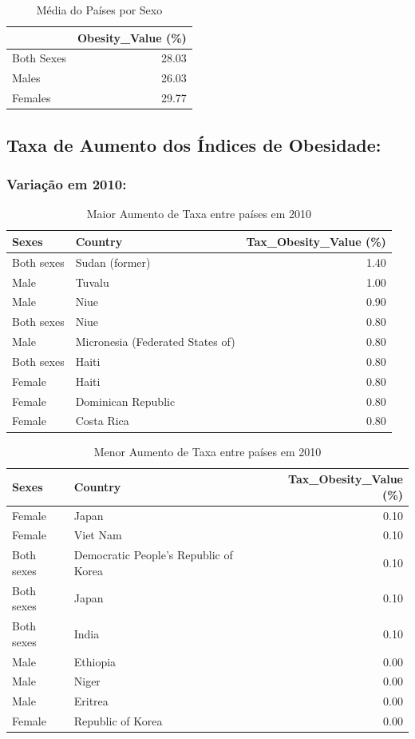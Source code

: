 \documentclass{article}%
\begin{document}
\begin{table}[htbp]%
\centering%
\begin{tabular}{lr}
\toprule
 & Obesity\_Value (\%) \\
\midrule
Both Sexes & 28.03 \\
Males & 26.03 \\
Females & 29.77 \\
\bottomrule
\end{tabular}
%
\caption{Média do Países por Sexo}%
\end{table}

%
\newpage%
\subsection{Taxa de Aumento dos Índices de Obesidade:}%
\label{subsec:TaxadeAumentodosndicesdeObesidade}%
\subsubsection{Variação em 2010:}%
\label{ssubsec:Variaoem2010}%


\begin{table}[htbp]%
\centering%
\begin{tabular}{llr}
\toprule
Sexes & Country & Tax\_Obesity\_Value (\%) \\
\midrule
Both sexes & Sudan (former) & 1.40 \\
Male & Tuvalu & 1.00 \\
Male & Niue & 0.90 \\
Both sexes & Niue & 0.80 \\
Male & Micronesia (Federated States of) & 0.80 \\
Both sexes & Haiti & 0.80 \\
Female & Haiti & 0.80 \\
Female & Dominican Republic & 0.80 \\
Female & Costa Rica & 0.80 \\
\bottomrule
\end{tabular}
%
\caption{Maior Aumento de Taxa entre países em 2010}%
\end{table}

%


\begin{table}[htbp]%
\centering%
\begin{tabular}{llr}
\toprule
Sexes & Country & Tax\_Obesity\_Value (\%) \\
\midrule
Female & Japan & 0.10 \\
Female & Viet Nam & 0.10 \\
Both sexes & Democratic People's Republic of Korea & 0.10 \\
Both sexes & Japan & 0.10 \\
Both sexes & India & 0.10 \\
Male & Ethiopia & 0.00 \\
Male & Niger & 0.00 \\
Male & Eritrea & 0.00 \\
Female & Republic of Korea & 0.00 \\
\bottomrule
\end{tabular}
%
\caption{Menor Aumento de Taxa entre países em 2010}%
\end{table}
\end{document}
